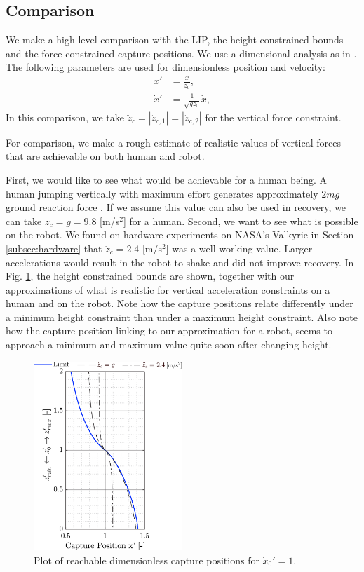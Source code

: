 \documentclass[letterpaper, 10 pt, conference]{ieeeconf}  %
\newcommand{\ddzc}{\ddot{z}_{c}}
\newcommand{\ddzcf}{\ddot{z}_{c,1}}
\newcommand{\ddzcs}{\ddot{z}_{c,2}}
\begin{document}
\subsection{Comparison}\label{sec:comparison}
We make a high-level comparison with the LIP, the height constrained bounds and the force constrained capture positions. We use a dimensional analysis as in \cite{pratt2006capture,stephens2007humanoid,koolen2012capturability}. The following parameters are used for dimensionless position and velocity:
\begin{align}
	x' &= \frac{x}{z_0}, \\
	\dot{x}' &= \frac{1}{\sqrt{gz_0}}\dot{x},
\end{align}
In this comparison, we take $\ddzc=|\ddzcf|=|\ddzcs|$ for the vertical force constraint.

For comparison, we make a rough estimate of realistic values of vertical forces that are achievable on both human and robot.

First, we would like to see what would be achievable for a human being. A human jumping vertically with maximum effort generates approximately $2mg$ ground reaction force \cite{linthorne2001analysis}. If we assume this value can also be used in recovery, we can take $\ddot{z}_c=g=9.8$ [m/s$^2$] for a human. Second, we want to see what is possible on the robot. We found on hardware experiments on NASA's Valkyrie in Section \ref{subsec:hardware} that $\ddot{z}_c=2.4$ [m/s$^2$] was a well working value. Larger accelerations would result in the robot to shake and did not improve recovery. In Fig. \ref{fig:caplimits}, the height constrained bounds are shown, together with our approximations of what is realistic for vertical acceleration constraints on a human and on the robot. Note how the capture positions relate differently under a minimum height constraint than under a maximum height constraint. Also note how the capture position linking to our approximation for a robot, seems to approach a minimum and maximum value quite soon after changing height.
\begin{figure}
      \centering
      \includegraphics[width=2.2in]{caplimits.png}
      \caption{Plot of reachable dimensionless capture positions for $\dot{x}_0'=1$. }
      \label{fig:caplimits}
\end{figure}
\end{document}
